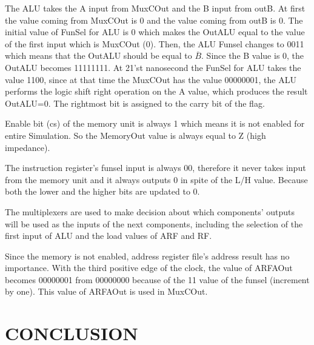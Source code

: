 \documentclass[pdftex,12pt,a4paper]{article}
\begin{document}
The ALU takes the A input from MuxCOut and the B input from outB. At first the value coming from MuxCOut is 0 and the value coming
from outB is 0. The initial value of FunSel for ALU is 0 which makes the OutALU equal to the value of the first input which is 
MuxCOut (0). Then, the ALU Funsel changes to 0011 which means that the OutALU should be equal to $\overline{B}$. Since the B value
is 0, the OutALU becomes 11111111. At 21'st nanosecond the FunSel for ALU takes the value 1100, since at that time the MuxCOut has
the value 00000001, the ALU performs the logic shift right operation on the A value, which produces the result OutALU=0. The rightmost
bit is assigned to the carry bit of the flag.

Enable bit (cs) of the memory unit is always 1 which means it is not enabled for entire Simulation. So the MemoryOut value is always
equal to Z (high impedance). 

The instruction register's funsel input is always 00, therefore it never takes input from the memory unit and it always outputs 0 
in spite of the L/H value. Because both the lower and the higher bits are updated to 0.

The multiplexers are used to make decision about which components' outputs will be used as the inputs of the next components, including
the selection of the first input of ALU and the load values of ARF and RF.

Since the memory is not enabled, address register file's address result has no importance. With the third positive edge of the clock, 
the value of ARFAOut becomes 00000001 from 00000000 because of the 11 value of the funsel (increment by one). This value of ARFAOut
is used in MuxCOut.

\section{CONCLUSION}
\end{document}
